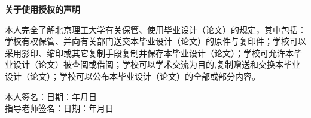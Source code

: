 \vspace{17mm}

\begin{center}
  \heiti{}\textbf{关于使用授权的声明}
\end{center}

本人完全了解北京理工大学有关保管、使用毕业设计（论文）的规定，其中包括：学校有权保管、并向有关部门送交本毕业设计（论文）的原件与复印件；学校可以采用影印、缩印或其它复制手段复制并保存本毕业设计（论文）；学校可允许本毕业设计（论文）被查阅或借阅；学校可以学术交流为目的,复制赠送和交换本毕业设计（论文）；学校可以公布本毕业设计（论文）的全部或部分内容。

\vspace*{1mm}

\begin{flushright}
  \begin{spacing}{1.65}
    本人签名：\hspace{40mm}日\hspace{2.5mm}期：\hspace{13mm}年\hspace{8mm}月\hspace{8mm}日\\
    指导老师签名：\hspace{40mm}日\hspace{2.5mm}期：\hspace{13mm}年\hspace{8mm}月\hspace{8mm}日
  \end{spacing}
\end{flushright}

\newpage
